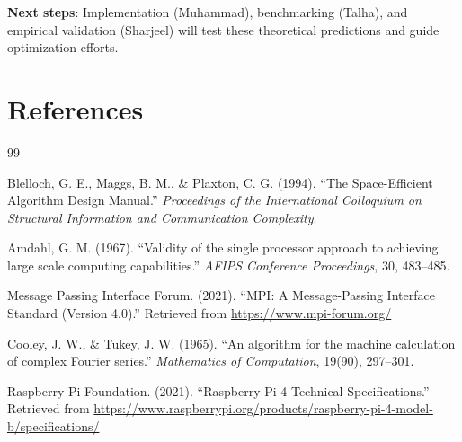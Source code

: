 \documentclass[11pt,a4paper]{article}
\begin{document}
\textbf{Next steps}: Implementation (Muhammad), benchmarking (Talha), and empirical validation (Sharjeel) will test these theoretical predictions and guide optimization efforts.

\section*{References}

\begin{thebibliography}{99}

 Blelloch, G. E., Maggs, B. M., \& Plaxton, C. G. (1994). 
``The Space-Efficient Algorithm Design Manual.'' 
\textit{Proceedings of the International Colloquium on Structural Information and Communication Complexity}.

 Amdahl, G. M. (1967). 
``Validity of the single processor approach to achieving large scale computing capabilities.'' 
\textit{AFIPS Conference Proceedings}, 30, 483–485.

 Message Passing Interface Forum. (2021). 
``MPI: A Message-Passing Interface Standard (Version 4.0).'' 
Retrieved from \url{https://www.mpi-forum.org/}

 Cooley, J. W., \& Tukey, J. W. (1965). 
``An algorithm for the machine calculation of complex Fourier series.'' 
\textit{Mathematics of Computation}, 19(90), 297–301.

 Raspberry Pi Foundation. (2021). 
``Raspberry Pi 4 Technical Specifications.'' 
Retrieved from \url{https://www.raspberrypi.org/products/raspberry-pi-4-model-b/specifications/}

\end{thebibliography}
\end{document}
